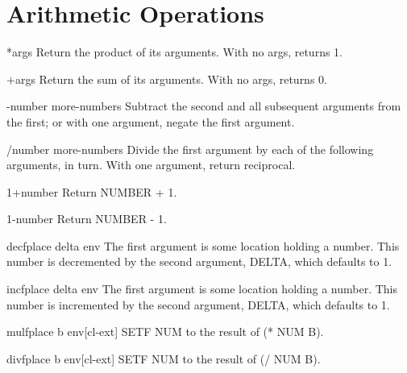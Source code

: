 \documentclass[10pt,english]{book}
\begin{document}
\section{Arithmetic Operations}
\label{sec:arithm-oper}

\begin{function}{*}{\rest args}
  Return the product of its arguments. With no args, returns 1.
\end{function}

\begin{function}{+}{\rest args}
  Return the sum of its arguments. With no args, returns 0.
\end{function}

\begin{function}{-}{number \rest more-numbers}
  Subtract the second and all subsequent arguments from the first;
  or with one argument, negate the first argument.
\end{function}

\begin{function}{/}{number \rest more-numbers}
  Divide the first argument by each of the following arguments, in turn.
  With one argument, return reciprocal.
\end{function}

\begin{function}{1+}{number}
  Return NUMBER + 1.
\end{function}

\begin{function}{1-}{number}
  Return NUMBER - 1.
\end{function}

\begin{macro}{decf}{place \op delta \env env}
  The first argument is some location holding a number. This number is
  decremented by the second argument, DELTA, which defaults to 1.
\end{macro}

\begin{macro}{incf}{place \op delta \env env}
  The first argument is some location holding a number. This number is
  incremented by the second argument, DELTA, which defaults to 1.
\end{macro}

\begin{macro}{mulf}{place b \env env}[cl-ext]
  SETF NUM to the result of (* NUM B).
\end{macro}

\begin{macro}{divf}{place b \env env}[cl-ext]
  SETF NUM to the result of (/ NUM B).
\end{macro}
\end{document}
